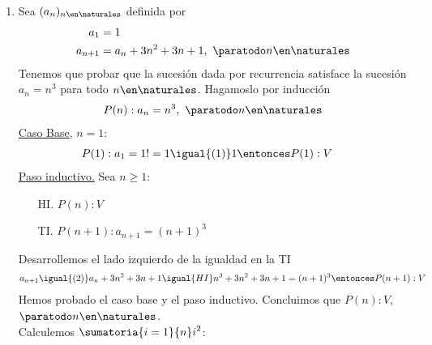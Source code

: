 \begin{enumerate}[label=\roman*)]
    \item Sea $(a_n)_{n \en \naturales }$ definida por
    \setcounter{equation}{0}
    \begin{align}
        a_1 &= 1 \\
        a_{n+1} &= a_n + 3n^2 + 3n + 1,\ \paratodo n \en \naturales 
    \end{align} 
    Tenemos que probar que la sucesión dada por recurrencia satisface la sucesión $a_n = n^3$ para todo $n \en 
    \naturales $. 
    Hagamoslo por inducción
    \begin{align*}
        P(n): a_n = n^3,\ \paratodo n \en \naturales 
    \end{align*}
    \underline{Caso Base}, $n = 1$:
	    \begin{align*}
		    &P(1): a_1 = 1! = 1 \igual{(1)} 1 \entonces P(1):V
	    \end{align*}
	\underline{Paso inductivo.} Sea $n \geq 1$:
	\begin{enumerate}
        \item[HI.] $P(n): V$
        \item[TI.] $P(n+1): a_{n+1} = (n+1)^3$
    \end{enumerate}
 	Desarrollemos el lado izquierdo de la igualdad en la TI
    \begin{align*}
            a_{n+1} \igual{(2)} a_n + 3n^2 + 3n + 1 \igual{HI} n^3 + 3n^2 + 3n + 1 = (n+1)^3 
        \entonces P(n+1):V
    \end{align*}
    Hemos probado el caso base y el paso inductivo. Concluimos que $P(n):V,$ $\paratodo n \en \naturales $. \\

    Calculemos $\displaystyle \sumatoria{i=1}{n} i^2 $:


\end{enumerate}
